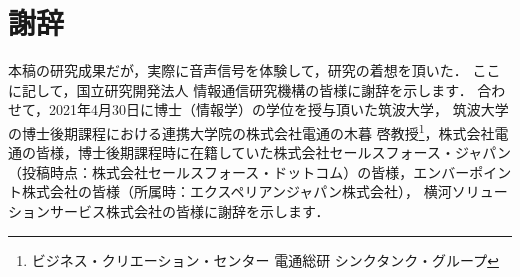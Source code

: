 \documentclass{deimj}
\begin{document}
\section*{謝辞}
\vspace{-8pt}
本稿の研究成果だが，実際に音声信号を体験して，研究の着想を頂いた．
ここに記して，国立研究開発法人 情報通信研究機構の皆様に謝辞を示します．
%
合わせて，2021年4月30日に博士（情報学）の学位を授与頂いた筑波大学，
筑波大学の博士後期課程における連携大学院の株式会社電通の木暮 啓教授\footnote{ビジネス・クリエーション・センター 電通総研 シンクタンク・グループ}，株式会社電通の皆様，博士後期課程時に在籍していた株式会社セールスフォース・ジャパン（投稿時点：株式会社セールスフォース・ドットコム）の皆様，エンバーポイント株式会社の皆様（所属時：エクスペリアンジャパン株式会社），
横河ソリューションサービス株式会社の皆様に謝辞を示します．



\end{document}
